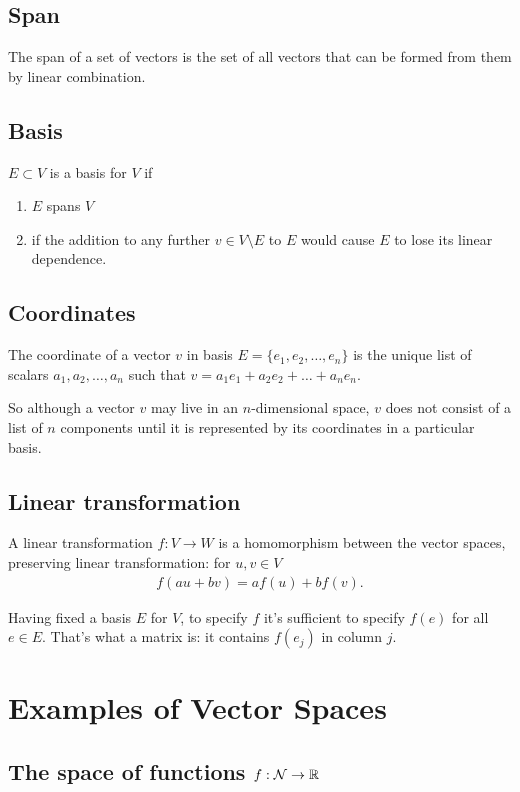 \subsection{Span}
The span of a set of vectors is the set of all vectors that can be formed from
them by linear combination.


\subsection{Basis}
$E \subset V$ is a basis for $V$ if
\begin{enumerate}
\item $E$ spans $V$
\item if the addition to any further $v \in V\setminus E$ to $E$ would cause
  $E$ to lose its linear dependence.
\end{enumerate}


\subsection{Coordinates}
The coordinate of a vector $v$ in basis $E = \{e_1, e_2, \ldots, e_n\}$ is the
unique list of scalars $a_1, a_2, \ldots, a_n$ such that
$v = a_1e_1 + a_2e_2 + \ldots + a_ne_n$.

So although a vector $v$ may live in an $n$-dimensional space, $v$ does not
consist of a list of $n$ components until it is represented by its coordinates
in a particular basis.


\subsection{Linear transformation}
A linear transformation $f: V \to W$ is a homomorphism between the vector
spaces, preserving linear transformation: for $u, v \in V$
\begin{align*}
  f(au + bv) = af(u) + bf(v).
\end{align*}

Having fixed a basis $E$ for $V$, to specify $f$ it's sufficient to specify
$f(e)$ for all $e \in E$. That's what a matrix is: it contains $f(e_j)$ in
column $j$.

\section*{Examples of Vector Spaces}

\subsection{The space of functions $f:\mathcal{N} \to \mathbb{R}$}

